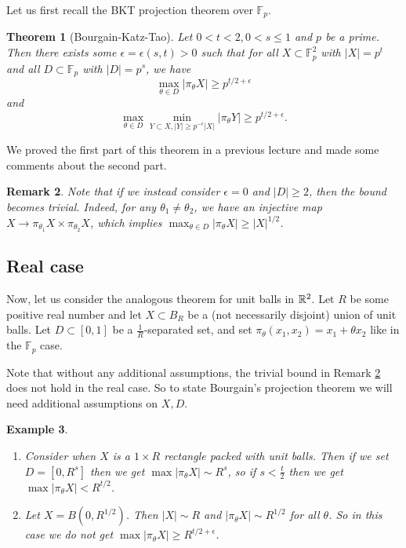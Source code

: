 \documentclass[12pt]{amsart}
\newtheorem{theorem}{Theorem}[section]
\newtheorem{example}[theorem]{Example}
\newtheorem{remark}[theorem]{Remark}
\newcommand{\F}{\mathbb{F}}
\newcommand{\eps}{\epsilon}
\begin{document}
Let us first recall the BKT projection theorem over $\F_p$.

\begin{theorem}[Bourgain-Katz-Tao]
    Let $0<t<2,0<s\leq 1$ and $p$ be a prime. Then there exists some $\eps=\eps(s,t)>0$ such that for all $X\subset\F_p^2$ with $|X|=p^t$ and all $D\subset\F_p$ with $|D|=p^s$, we have
    $$\max_{\theta\in D}|\pi_\theta X|\geq p^{t/2+\eps}$$
    and
    $$\max_{\theta\in D}\min_{Y\subset X,|Y|\geq p^{-\eps}|X|}|\pi_\theta Y|\geq p^{t/2+\eps}.$$
\end{theorem}

We proved the first part of this theorem in a previous lecture and made some comments about the second part.

\begin{remark}\label{rem:1}
    Note that if we instead consider $\eps=0$ and $|D|\geq 2$, then the bound becomes trivial. Indeed, for any $\theta_1\neq\theta_2$, we have an injective map $X\to\pi_{\theta_1}X\times\pi_{\theta_2}X$, which implies $\max_{\theta\in D}|\pi_\theta X|\geq |X|^{1/2}$.
\end{remark}

\subsection{Real case}

Now, let us consider the analogous theorem for unit balls in $\mathbb{R}^2$. Let $R$ be some positive real number and let $X\subset B_R$ be a (not necessarily disjoint) union of unit balls. Let $D\subset[0,1]$ be a $\frac{1}{R}$-separated set, and set $\pi_\theta(x_1,x_2)=x_1+\theta x_2$ like in the $\F_p$ case.

Note that without any additional assumptions, the trivial bound in Remark \ref{rem:1} does not hold in the real case. So to state Bourgain's projection theorem we will need additional assumptions on $X,D$.

\begin{example}
    \begin{enumerate}
        \item Consider when $X$ is a $1\times R$ rectangle packed with unit balls. Then if we set $D=[0,R^s]$ then we get $\max|\pi_\theta X|\sim R^s$, so if $s<\frac{t}{2}$ then we get $\max|\pi_\theta X|<R^{t/2}$.
        \item Let $X=B(0,R^{1/2})$. Then $|X|\sim R$ and $|\pi_\theta X|\sim R^{1/2}$ for all $\theta$. So in this case we do not get $\max|\pi_\theta X|\geq R^{t/2+\eps}$.
    \end{enumerate}
\end{example}
\end{document}
